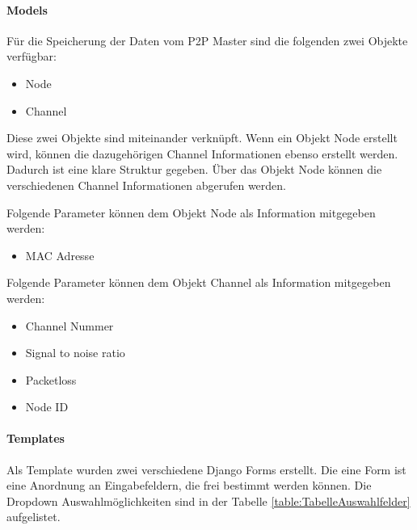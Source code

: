 \paragraph{Models}
Für die Speicherung der Daten vom P2P Master sind die folgenden zwei Objekte verfügbar: 
\begin{itemize}
	\item Node
	\item Channel
\end{itemize} 

Diese zwei Objekte sind miteinander verknüpft.
Wenn ein Objekt Node erstellt wird, können die dazugehörigen Channel Informationen ebenso erstellt werden.
Dadurch ist eine klare Struktur gegeben.
Über das Objekt Node können die verschiedenen Channel Informationen abgerufen werden.

Folgende Parameter können dem Objekt Node als Information mitgegeben werden:
\begin{itemize}
	\item MAC Adresse
\end{itemize} 

Folgende Parameter können dem Objekt Channel als Information mitgegeben werden:
\begin{itemize}
	\item Channel Nummer
	\item Signal to noise ratio
	\item Packetloss
	\item Node ID
\end{itemize}

\paragraph{Templates}
Als Template wurden zwei verschiedene Django Forms erstellt. Die eine Form ist eine Anordnung an Eingabefeldern, die frei bestimmt werden können. Die Dropdown Auswahlmöglichkeiten sind in der Tabelle \ref{table:TabelleAuswahlfelder} aufgelistet.

